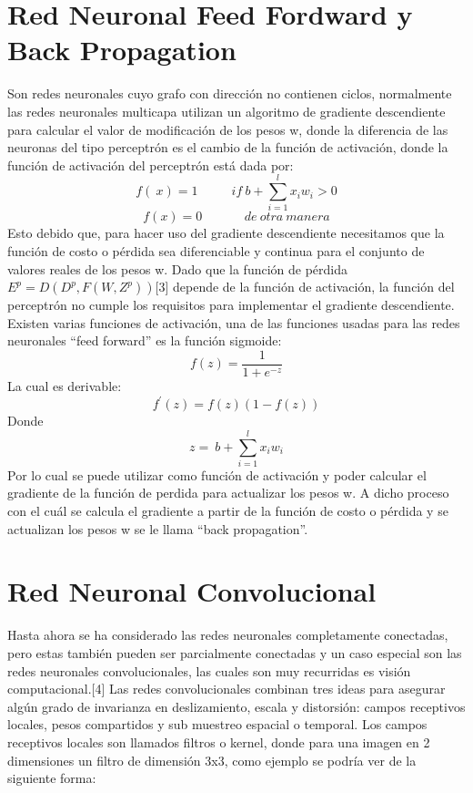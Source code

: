 \section{Red Neuronal Feed Fordward y Back Propagation}
Son redes neuronales cuyo grafo con dirección no contienen ciclos, normalmente las redes neuronales multicapa utilizan un algoritmo de gradiente descendiente para calcular el valor de modificación de los pesos w, donde la diferencia de las neuronas del tipo perceptrón es el cambio de la función de activación, donde la función de activación del perceptrón está dada por:
$$f\left(\ x\right)=1\ \ \ \ \ \ \ \ \ \ \ \ if\ b+\sum_{i=1}^{l}{x_iw_i}>0$$
$$f\left(x\right)=0\ \ \ \ \ \ \ \ \ \ \ \ \ \ \ de\ otra\ manera$$
Esto debido que, para hacer uso del gradiente descendiente necesitamos que la función de costo o pérdida sea diferenciable y continua para el conjunto de valores reales de los pesos w. Dado que la función de pérdida $E^p=D\left(D^p,F\left(W,Z^p\right)\right)$[3] depende de la función de activación, la función del perceptrón no cumple los requisitos para implementar el gradiente descendiente.
Existen varias funciones de activación, una de las funciones usadas para las redes neuronales “feed forward” es la función sigmoide:
$$f\left(z\right)=\frac{1}{1+e^{-z}}$$
 La cual es derivable:
$$f^\prime\left(z\right)=f\left(z\right)\left(1-f\left(z\right)\right)$$
Donde 
$$z=\ b+\sum_{i=1}^{l}{x_iw_i}$$
Por lo cual se puede utilizar como función de activación y poder calcular el gradiente de la función de perdida para actualizar los pesos w. A dicho proceso con el cuál se calcula el gradiente a partir de la función de costo o pérdida y se actualizan los pesos w se le llama “back propagation”.

\section{Red Neuronal Convolucional}
Hasta ahora se ha considerado las redes neuronales completamente conectadas, pero estas también pueden ser parcialmente conectadas y un caso especial son las redes neuronales convolucionales, las cuales son muy recurridas es visión computacional.[4]
Las redes convolucionales combinan tres ideas para asegurar algún grado de invarianza en deslizamiento, escala y distorsión: campos receptivos locales, pesos compartidos y sub muestreo espacial o temporal. Los campos receptivos locales son llamados filtros o kernel, donde para una imagen en 2 dimensiones un filtro de dimensión 3x3, como ejemplo se podría ver de la siguiente forma:

